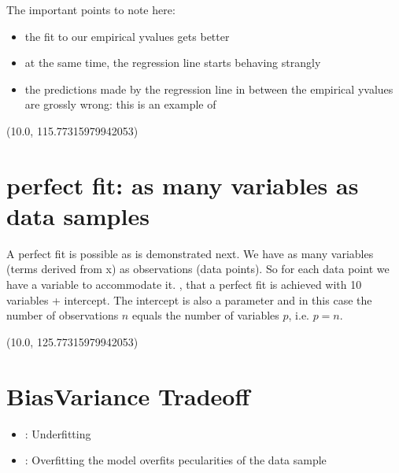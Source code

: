 \documentclass[letterpaper,10pt,english]{jupyterBook}
\begin{document}
\sphinxAtStartPar
The important points to note here:
\begin{itemize}
\item {} 
\sphinxAtStartPar
the fit to our empirical y\sphinxhyphen{}values gets better

\item {} 
\sphinxAtStartPar
at the same time, the regression line starts behaving strangly

\item {} 
\sphinxAtStartPar
the predictions made by the regression line in between the empirical y\sphinxhyphen{}values are grossly wrong: this is an example of 

\end{itemize}

\begin{sphinxVerbatim}[commandchars=\\\{\}]
(\PYGZhy{}10.0, 115.77315979942053)
\end{sphinxVerbatim}

\noindent{}


\section{perfect fit: as many variables as data samples}
\label{\detokenize{Regression_Techniques:perfect-fit-as-many-variables-as-data-samples}}
\sphinxAtStartPar
A perfect fit is possible as is demonstrated next. We have as many variables (terms derived from x) as observations (data points). So for each data point we have a variable to accommodate it.
, that a perfect fit is achieved with 10 variables + intercept. The intercept is also a parameter and in this case the number of observations \(n\) equals the number of variables \(p\), i.e. \(p=n\).

\begin{sphinxVerbatim}[commandchars=\\\{\}]
(\PYGZhy{}10.0, 125.77315979942053)
\end{sphinxVerbatim}

\noindent{}


\section{Bias\sphinxhyphen{}Variance Tradeoff}
\label{\detokenize{Regression_Techniques:bias-variance-tradeoff}}
\sphinxAtStartPar
{}
\begin{itemize}
\item {} 
\sphinxAtStartPar
{}: Underfitting

\item {} 
\sphinxAtStartPar
{}: Overfitting \sphinxhyphen{} the model overfits pecularities of the data sample

\end{itemize}
\end{document}
